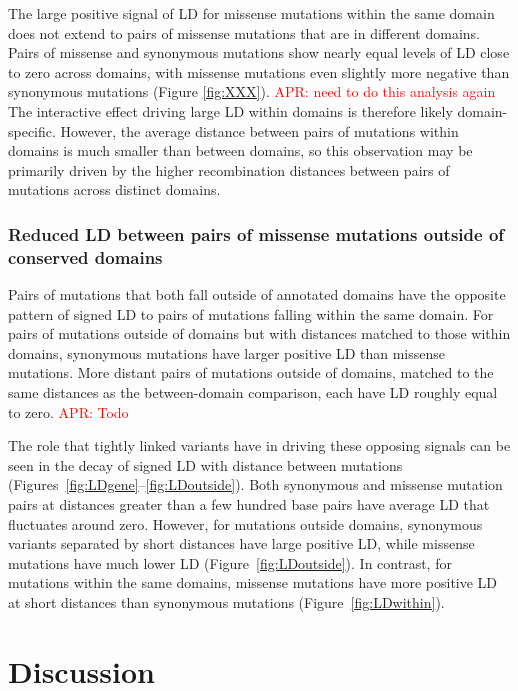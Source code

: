 \documentclass[]{article}
\newcommand{\comment}[1]{{\textcolor{red}{APR: #1}}}
\begin{document}
The large positive signal of LD for missense mutations within the same
domain does not extend to pairs of missense mutations that are in
different domains. Pairs of missense and synonymous mutations show
nearly equal levels of LD close to zero across domains, with missense mutations
even slightly more negative than synonymous mutations (Figure \ref{fig:XXX}).
\comment{need to do this analysis again}
The interactive effect driving large LD within domains is therefore likely
domain-specific. However, the average distance between pairs of mutations
within domains is much smaller than between domains, so this observation may be
primarily driven by the higher recombination distances between pairs of mutations
across distinct domains.

\subsubsection{Reduced LD between pairs of missense mutations outside of conserved domains}

Pairs of mutations that both fall outside of annotated domains have the
opposite pattern of signed LD to pairs of mutations falling within the same
domain. For pairs of mutations outside of domains but with distances matched to
those within domains, synonymous mutations have larger positive LD than
missense mutations. More distant pairs of mutations outside of domains, matched
to the same distances as the between-domain comparison, each have LD roughly
equal to zero. \comment{Todo}

The role that tightly linked variants have in driving these opposing signals
can be seen in the decay of signed LD with distance between mutations
(Figures~\ref{fig:LDgene}--\ref{fig:LDoutside}). Both synonymous and missense
mutation pairs at distances greater than a few hundred base pairs have average
LD that fluctuates around zero. However, for mutations outside domains,
synonymous variants separated by short distances have large positive LD, while
missense mutations have much lower LD (Figure~\ref{fig:LDoutside}). In contrast,
for mutations within the same domains, missense mutations have more positive
LD at short distances than synonymous mutations (Figure~\ref{fig:LDwithin}).

\section{Discussion}\label{sec:discussion}
\end{document}
